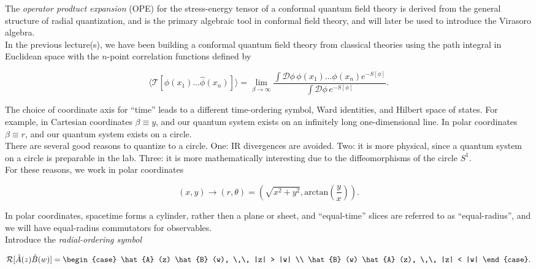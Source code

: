 
\noindent The \textit{operator prodtuct expansion} (OPE) for the stress-energy tensor of a conformal quantum field theory is derived from the general structure of radial quantization, and is the primary algebraic tool in conformal field theory, and will later be used to introduce the Virasoro algebra. \\

\noindent In the previous lecture(s), we have been building a conformal quantum field theory from classical theories using the path integral in Euclidean space with the $n$-point correlation functions defined by

\begin{equation}
\langle \mathcal{T} [\hat{\phi} (x_1) \dots \hat{\phi} (x_n) ] \rangle = \lim_{\beta \rightarrow \infty} \frac{\int \mathcal{D} \phi \, \phi (x_1) \dots \phi (x_n) e^{-S[\phi]}}{\int \mathcal{D} \phi \, e^{-S[\phi]}}.
\end{equation}

\noindent The choice of coordinate axis for ``time'' leads to a different time-ordering symbol, Ward identities, and Hilbert space of states. For example, in Cartesian coordinates $\beta \equiv y$, and our quantum system exists on an infinitely long one-dimensional line. In polar coordinates $\beta \equiv r$, and our quantum system exists on a circle. \\

\noindent There are several good reasons to quantize to a circle. One: IR divergences are avoided. Two: it is more physical, since a quantum system on a circle is preparable in the lab. Three: it is more mathematically interesting due to the diffeomorphisms of the circle $S^1$. \\

\noindent For these reasons, we work in polar coordinates 

\begin{equation}
(x,y) \rightarrow (r,\theta) = \left(\sqrt{x^2 + y^2}, \text{arctan}\left(\frac{y}{x}\right)\right).
\end{equation}

\noindent In polar coordinates, spacetime forms a cylinder, rather then a plane or sheet, and ``equal-time'' slices are referred to as ``equal-radius'', and we will have equal-radius commutators for observables. \\

\noindent Introduce the \textit{radial-ordering symbol}

\begin{equation}
\mathcal{R} [\hat{A}(z) \hat{B} (w) ] = \begin{case} \hat{A} (z) \hat{B} (w), \,\, |z| > |w| \\ \hat{B} (w) \hat{A} (z), \,\, |z| < |w| \end{case}.
\end{equation}

